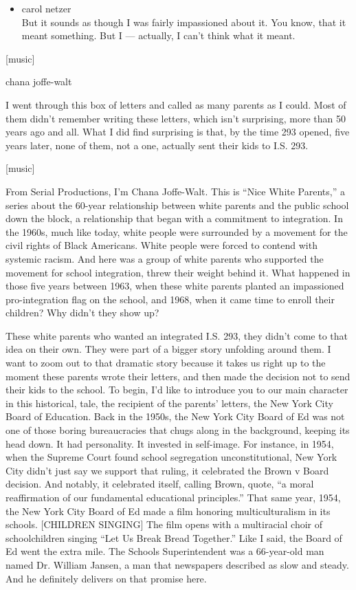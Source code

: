 \begin{itemize}
\tightlist
\item
  carol netzer\\
  But it sounds as though I was fairly impassioned about it. You know,
  that it meant something. But I --- actually, I can't think what it
  meant.
\end{itemize}

{[}music{]}

chana joffe-walt

I went through this box of letters and called as many parents as I
could. Most of them didn't remember writing these letters, which isn't
surprising, more than 50 years ago and all. What I did find surprising
is that, by the time 293 opened, five years later, none of them, not a
one, actually sent their kids to I.S. 293.

{[}music{]}

From Serial Productions, I'm Chana Joffe-Walt. This is ``Nice White
Parents,'' a series about the 60-year relationship between white parents
and the public school down the block, a relationship that began with a
commitment to integration. In the 1960s, much like today, white people
were surrounded by a movement for the civil rights of Black Americans.
White people were forced to contend with systemic racism. And here was a
group of white parents who supported the movement for school
integration, threw their weight behind it. What happened in those five
years between 1963, when these white parents planted an impassioned
pro-integration flag on the school, and 1968, when it came time to
enroll their children? Why didn't they show up?

These white parents who wanted an integrated I.S. 293, they didn't come
to that idea on their own. They were part of a bigger story unfolding
around them. I want to zoom out to that dramatic story because it takes
us right up to the moment these parents wrote their letters, and then
made the decision not to send their kids to the school. To begin, I'd
like to introduce you to our main character in this historical, tale,
the recipient of the parents' letters, the New York City Board of
Education. Back in the 1950s, the New York City Board of Ed was not one
of those boring bureaucracies that chugs along in the background,
keeping its head down. It had personality. It invested in self-image.
For instance, in 1954, when the Supreme Court found school segregation
unconstitutional, New York City didn't just say we support that ruling,
it celebrated the Brown v Board decision. And notably, it celebrated
itself, calling Brown, quote, ``a moral reaffirmation of our fundamental
educational principles.'' That same year, 1954, the New York City Board
of Ed made a film honoring multiculturalism in its schools. {[}CHILDREN
SINGING{]} The film opens with a multiracial choir of schoolchildren
singing ``Let Us Break Bread Together.'' Like I said, the Board of Ed
went the extra mile. The Schools Superintendent was a 66-year-old man
named Dr. William Jansen, a man that newspapers described as slow and
steady. And he definitely delivers on that promise here.

